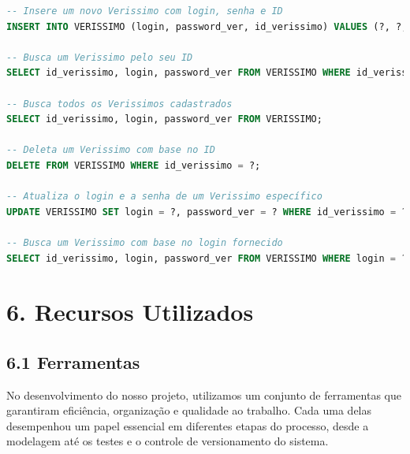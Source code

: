 \documentclass[12pt,a4paper]{report}
\begin{document}
\begin{lstlisting}[language=SQL, caption=Consultas feitas em VerissimoDAO]
-- Insere um novo Verissimo com login, senha e ID
INSERT INTO VERISSIMO (login, password_ver, id_verissimo) VALUES (?, ?, ?);

-- Busca um Verissimo pelo seu ID
SELECT id_verissimo, login, password_ver FROM VERISSIMO WHERE id_verissimo = ?;

-- Busca todos os Verissimos cadastrados
SELECT id_verissimo, login, password_ver FROM VERISSIMO;

-- Deleta um Verissimo com base no ID
DELETE FROM VERISSIMO WHERE id_verissimo = ?;

-- Atualiza o login e a senha de um Verissimo específico
UPDATE VERISSIMO SET login = ?, password_ver = ? WHERE id_verissimo = ?;

-- Busca um Verissimo com base no login fornecido
SELECT id_verissimo, login, password_ver FROM VERISSIMO WHERE login = ?;
\end{lstlisting}
\chapter{6. Recursos Utilizados}
\section{6.1 Ferramentas}
No desenvolvimento do nosso projeto, utilizamos um conjunto de ferramentas que garantiram eficiência, organização e qualidade ao trabalho. Cada uma delas desempenhou um papel essencial em diferentes etapas do processo, desde a modelagem até os testes e o controle de versionamento do sistema.
\end{document}
